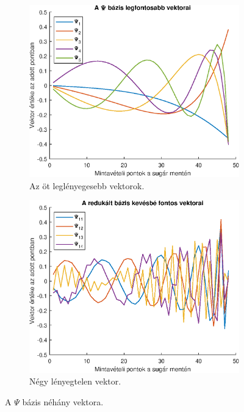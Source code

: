             \begin{figure}[h]
                \centering
                \begin{subfigure}{0.48\textwidth}
                    \includegraphics[width=\textwidth]{kep/euler_0.15_4_base_1_5.eps}
                    \caption{Az öt leglényegesebb vektorok.}
                \end{subfigure}
                \begin{subfigure}{0.48\textwidth}
                    \includegraphics[width=\textwidth]{kep/euler_0.15_4_base_11_14.eps}
                    \caption{Négy lényegtelen vektor.}
                \end{subfigure}
                \caption{A $\Psi$ bázis néhány vektora.}
                \label{fig:bazis}
            \end{figure}
